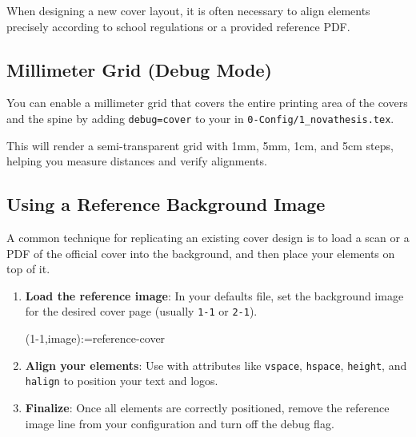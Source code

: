 When designing a new cover layout, it is often necessary to align elements precisely according to school regulations or a provided reference PDF.

\subsection{Millimeter Grid (Debug Mode)}
You can enable a millimeter grid that covers the entire printing area of the covers and the spine by adding \texttt{debug=cover} to your \latexinline{\ntsetup} in \texttt{0-Config/1\_novathesis.tex}.

\begin{ltx}
\end{ltx}

This will render a semi-transparent grid with 1mm, 5mm, 1cm, and 5cm steps, helping you measure distances and verify alignments.

\subsection{Using a Reference Background Image}
A common technique for replicating an existing cover design is to load a scan or a PDF of the official cover into the background, and then place your \latexinline{\ntaddtocover} elements on top of it.

\begin{enumerate}
  \item \textbf{Load the reference image}: In your defaults file, set the background image for the desired cover page (usually \texttt{1-1} or \texttt{2-1}).
  \begin{ltx}
  \thesiscover(1-1,image):={reference-cover}
  \end{ltx}
  \item \textbf{Align your elements}: Use \latexinline{\ntaddtocover} with attributes like \texttt{vspace}, \texttt{hspace}, \texttt{height}, and \texttt{halign} to position your text and logos.
  \begin{ltx}
  \end{ltx}
  \item \textbf{Finalize}: Once all elements are correctly positioned, remove the reference image line from your configuration and turn off the debug flag.
\end{enumerate}

